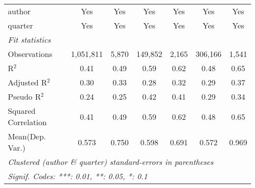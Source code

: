 \begin{tabular}{lcccccc}
   author                                                     & Yes            & Yes          & Yes            & Yes          & Yes            & Yes\\  
   quarter                                                    & Yes            & Yes          & Yes            & Yes          & Yes            & Yes\\  
   \midrule
   \emph{Fit statistics}\\
   Observations                                               & 1,051,811      & 5,870        & 149,852        & 2,165        & 306,166        & 1,541\\  
   R$^2$                                                      & 0.41           & 0.49         & 0.59           & 0.62         & 0.48           & 0.65\\  
   Adjusted R$^2$                                             & 0.30           & 0.33         & 0.28           & 0.32         & 0.29           & 0.37\\  
   Pseudo R$^2$                                               & 0.24           & 0.25         & 0.42           & 0.41         & 0.29           & 0.34\\  
   Squared Correlation                                        & 0.41           & 0.49         & 0.59           & 0.62         & 0.48           & 0.65\\  
Mean(Dep. Var.) & 0.573 & 0.750 & 0.598 & 0.691 & 0.572 & 0.969 \\
   \midrule \midrule
   \multicolumn{7}{l}{\emph{Clustered (author \& quarter) standard-errors in parentheses}}\\
   \multicolumn{7}{l}{\emph{Signif. Codes: ***: 0.01, **: 0.05, *: 0.1}}\\
\end{tabular}
\par\endgroup
